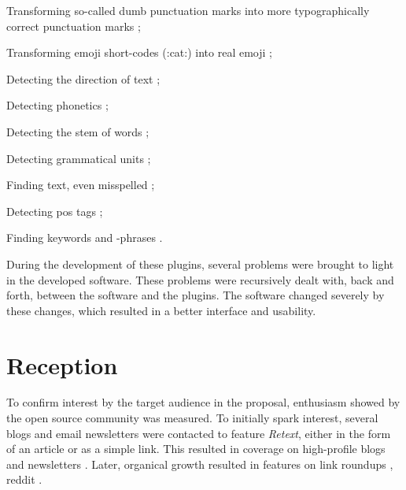\begin{aenumerate}
\item Transforming so-called dumb punctuation marks into more
  typographically correct punctuation marks
  \autocite*{wooorm/retext-smartypants-source-code};
\item Transforming emoji short-codes (:cat:) into real emoji
  \autocite*{wooorm/retext-emoji-source-code};
\item Detecting the direction of text
  \autocite*{wooorm/retext-directionality-source-code};
\item Detecting phonetics
  \autocite*{wooorm/retext-double-metaphone-source-code};
\item Detecting the stem of words
  \autocite*{wooorm/retext-porter-stemmer-source-code};
\item Detecting grammatical units \autocite*{wooorm/retext-visit-source-code};
\item Finding text, even misspelled
  \autocite*{wooorm/retext-search-source-code};
\item Detecting \gls{pos} tags \autocite*{wooorm/retext-pos-source-code};
\item Finding keywords and -phrases
  \autocite*{wooorm/retext-keywords-source-code}.
\end{aenumerate}

During the development of these plugins, several problems were brought to
  light in the developed software.
These problems were recursively dealt with, back and forth, between the
  software and the plugins.
The software changed severely by these changes, which resulted in a
  better interface and usability.

\section{Reception}\label{reception}

To confirm interest by the target audience in the proposal, enthusiasm
  showed by the open source community was measured.
To initially spark interest, several blogs and email newsletters were
  contacted to feature \emph{Retext}, either in the form of an article or as
  a simple link.
This resulted in coverage on high-profile blogs
  \autocite{dailyjs.com-natural-language-parsing-retext} and newsletters
  \autocites{nodeweekly.com-47}{javascriptweekly.com-193}
  {newspaper.io/javascript-2014-08-11}.
Later, organical growth resulted in features on link roundups
  \autocites{github.com-awesome-machine-learning}{github.com-awesome-nodejs},
  reddit \autocites{reddit.com-mention-1}{reddit.com-mention-2}
  {reddit.com-mention-3}.

